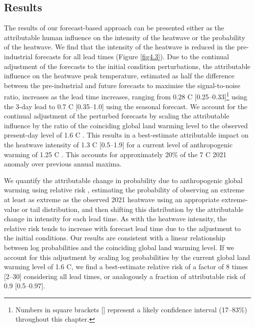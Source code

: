   \subsection{Results}\label{ch4:results}

  The results of our forecast-based approach can be presented either as the attributable human influence on the intensity of the heatwave or the probability of the heatwave. We find that the intensity of the heatwave is reduced in the pre-industrial forecasts for all lead times (Figure \ref{fig4.3}). Due to the continual adjustment of the forecasts to the initial condition perturbations, the attributable influence on the heatwave peak temperature, estimated as half the difference between the pre-industrial and future forecasts to maximise the signal-to-noise ratio, increases as the lead time increases, ranging from 0.28 \textdegree{}C [0.25--0.33]\footnote{Numbers in square brackets [] represent a likely confidence interval (17--83\%) throughout this chapter.} using the 3-day lead to 0.7 \textdegree{}C [0.35--1.0] using the seasonal forecast. We account for the continual adjustment of the perturbed forecasts by scaling the attributable influence by the ratio of the coinciding global land warming level to the observed present-day level of 1.6 \textdegree{}C \cite{osborn_land_2021}. This results in a best-estimate attributable impact on the heatwave intensity of 1.3 \textdegree{}C [0.5--1.9] for a current level of anthropogenic warming of 1.25 \textdegree{}C \cite{haustein_real-time_2017}. This accounts for approximately 20\% of the 7 \textdegree{}C 2021 anomaly over previous annual maxima.

  We quantify the attributable change in probability due to anthropogenic global warming using relative risk \cite{stone_end--end_2005}, estimating the probability of observing an extreme at least as extreme as the observed 2021 heatwave using an appropriate extreme-value or tail distribution, and then shifting this distribution by the attributable change in intensity for each lead time. As with the heatwave intensity, the relative risk tends to increase with forecast lead time due to the adjustment to the initial conditions. Our results are consistent with a linear relationship between log probabilities and the coinciding global land warming level. If we account for this adjustment by scaling log probabilities by the current global land warming level of 1.6 \textdegree{}C, we find a best-estimate relative risk of a factor of 8 times [2--30] considering all lead times, or analogously a fraction of attributable risk of 0.9 [0.5--0.97]. 

